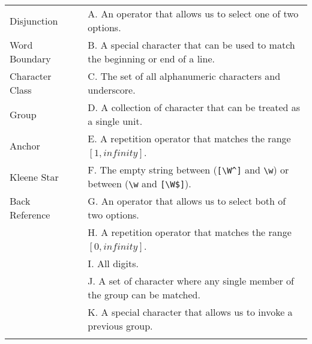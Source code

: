 \documentclass[addpoints]{exam}
\begin{document}
\begin{questions}
\begin{minipage}{\textwidth}
\begin{center}
    \begin{tabular}{ l c l }

\vspace{0.2cm}

\underline{\hspace{1cm}} Disjunction & \hspace{0.5cm} & A. An operator that allows us to select one of two options. \\
\vspace{0.2cm}
\underline{\hspace{1cm}} Word Boundary & \hspace{0.5cm} & B. A special character that can be used to match the beginning or end of a line. \\
\vspace{0.2cm}
\underline{\hspace{1cm}} Character Class & \hspace{0.5cm} & C. The set of all alphanumeric characters and underscore. \\
\vspace{0.2cm}
\underline{\hspace{1cm}} Group & \hspace{0.5cm} & D. A collection of character that can be treated as a single unit. \\
\vspace{0.2cm}
\underline{\hspace{1cm}} Anchor & \hspace{0.5cm} & E. A repetition operator that matches the range $ [1, infinity] $. \\
\vspace{0.2cm}
\underline{\hspace{1cm}} Kleene Star & \hspace{0.5cm} & F. The empty string between (\verb|[\W^]| and \verb|\w|) or between (\verb|\w| and \verb|[\W$]|). \\
\vspace{0.2cm}
\underline{\hspace{1cm}} Back Reference & \hspace{0.5cm} & G. An operator that allows us to select both of two options. \\
\vspace{0.2cm}
  & \hspace{0.5cm} & H. A repetition operator that matches the range $ [0, infinity] $. \\
\vspace{0.2cm}
  & \hspace{0.5cm} & I. All digits. \\
\vspace{0.2cm}
  & \hspace{0.5cm} & J. A set of character where any single member of the group can be matched. \\
\vspace{0.2cm}
  & \hspace{0.5cm} & K. A special character that allows us to invoke a previous group. \\
\vspace{0.2cm}


\end{tabular}
\end{center}
\end{minipage}
\end{questions}
\end{document}
